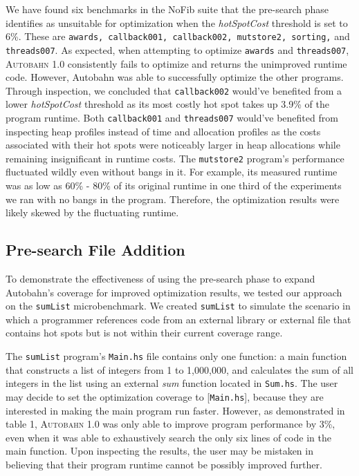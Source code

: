\documentclass[format=sigplan, review=true]{acmart}
\newcommand{\hotspots}[0]{hot spots}
\newcommand{\hotspotcost}[0]{\textit{hotSpotCost}}
\newcommand{\Ao}[0]{\textsc{Autobahn 1.0}}
\newcommand{\preopt}[0]{pre-search}
\newcommand{\Preopt}[0]{Pre-search}
\newcommand{\unimp}[0]{unimproved}
\begin{document}
We have found six benchmarks in the NoFib suite that the \preopt{} phase identifies as unsuitable for optimization when the \hotspotcost{} threshold is set to 6\%. These are \texttt{awards, callback001, callback002, mutstore2, sorting,} and \texttt{threads007}. As expected, when attempting to optimize \texttt{awards} and \texttt{threads007}, \Ao{} consistently fails to optimize and returns the \unimp{} runtime code. However, Autobahn was able to successfully optimize the other programs. Through inspection, we concluded that \texttt{callback002} would've benefited from a lower \hotspotcost{} threshold as its most costly hot spot takes up 3.9\% of the program runtime. Both \texttt{callback001} and \texttt{threads007} would've benefited from inspecting heap profiles instead of time and allocation profiles as the costs associated with their hot spots were noticeably larger in heap allocations while remaining insignificant in runtime costs. The \texttt{mutstore2} program's performance fluctuated wildly even without bangs in it. For example, its measured runtime was as low as 60\% - 80\% of its original runtime in one third of the experiments we ran with no bangs in the program. Therefore, the optimization results were likely skewed by the fluctuating runtime.

\subsection{\Preopt{} File Addition}

To demonstrate the effectiveness of using the \preopt{} phase to expand Autobahn's coverage for improved optimization results, we tested our approach on the \texttt{sumList} microbenchmark. We created \texttt{sumList} to simulate the scenario in which a programmer references code from an external library or external file that contains \hotspots{} but is not within their current coverage range. 


The \texttt{sumList} program's \texttt{Main.hs} file contains only one function: a main function that constructs a list of integers from 1 to 1,000,000, and calculates the sum of all integers in the list using an external \textit{sum} function located in \texttt{Sum.hs}. The user may decide to set the optimization coverage to [\texttt{Main.hs}], because they are interested in making the main program run faster. However, as demonstrated in table 1, \Ao{} was only able to improve program performance by 3\%, even when it was able to exhaustively search the only six lines of code in the main function. Upon inspecting the results, the user may be mistaken in believing that their program runtime cannot be possibly improved further. 
\end{document}
